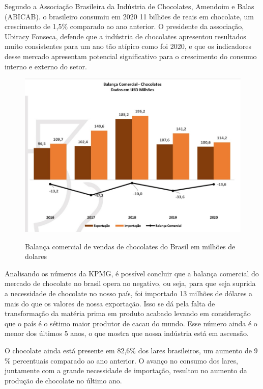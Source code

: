 \documentclass[
	12pt,				%
	openright,			%
	oneside,			%
	a4paper,			%
	english,			%
	french,				%
	spanish,			%
	brazil				%
	]{abntex2}
\begin{document}
Segundo a Associação Brasileira da Indústria de Chocolates, Amendoim e Balas (ABICAB). o brasileiro consumiu em 2020 11 bilhões de reais em chocolate, um crescimento de 1,5$\%$ comparado ao ano anterior. O presidente da associação, Ubiracy Fonseca, defende que a indústria de chocolates apresentou resultados muito consistentes para um ano tão atípico como foi 2020, e que os indicadores desse mercado apresentam potencial significativo para o crescimento do consumo interno e externo do setor. \cite{4}

\begin{figure}[H]
\begin{center}
\caption{Balança comercial de vendas de chocolates do Brasil em milhões de dolares}
\includegraphics[scale=0.4]{../../Pictures/fig2.jpeg} 
\label{figmercado}
\end{center}
\end{figure}

Analisando os números da KPMG, é possível concluir que a balança comercial do mercado de chocolate no brasil opera no negativo, ou seja, para que seja suprida a necessidade de chocolate no nosso país, foi importado 13 milhões de dólares a mais do que os valores de nossa exportação. Isso se dá pela falta de transformação da matéria prima em produto acabado levando em consideração que o país é o sétimo maior produtor de cacau do mundo. Esse número ainda é o menor dos últimos 5 anos, o que mostra que nossa indústria está em ascensão. \cite{forbes}

O chocolate ainda está presente em 82,6$\%$ dos lares brasileiros, um aumento de 9$\%$ percentuais comparado ao ano anterior. O avanço no consumo dos lares, juntamente com a grande necessidade de importação, resultou no aumento da produção de chocolate no último ano. \cite{4}
\end{document}
